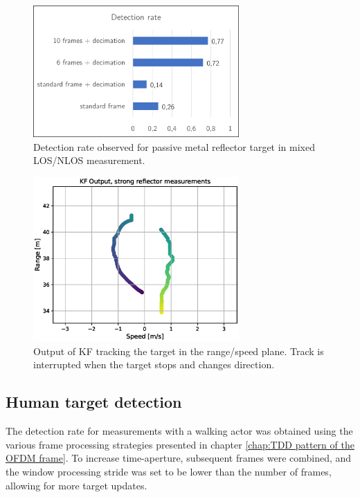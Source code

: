 \begin{figure}[H]
	\centering
	\includegraphics[width=0.7\textwidth]{Images/Test1/detect_hist_strong_ref.png}
	\caption{Detection rate observed for passive metal reflector target in mixed LOS/NLOS measurement.}
	\label{fig:Test1_detect_rate_strong_ref}
\end{figure}



\begin{figure}[H]
	\centering
	\includegraphics[width=0.7\textwidth]{Images/Test1/kf_track.eps}
	\caption{Output of KF tracking the target in the range/speed plane. Track is interrupted when the target stops and changes direction.}
	\label{fig:Test1_kf_track_strong_ref}
\end{figure}


\subsection{Human target detection}

The detection rate for measurements with a walking actor was obtained using the various frame processing strategies presented in chapter \ref{chap:TDD pattern of the OFDM frame}. To increase time-aperture, subsequent frames were combined, and the window processing stride was set to be lower than the number 
of frames, allowing for more target updates.

